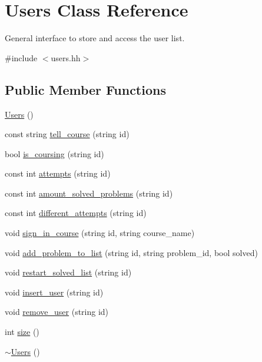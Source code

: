 \hypertarget{classUsers}{}\section{Users Class Reference}
\label{classUsers}


General interface to store and access the user list.  




{\ttfamily \#include $<$users.\+hh$>$}

\subsection*{Public Member Functions}
\begin{DoxyCompactItemize}
\item 
\hyperlink{classUsers_af1f5c371c3f1e7f9b14210ed0d3718bc}{Users} ()
\item 
const string \hyperlink{classUsers_ae684c15122bfac0f515a9c87307e0bbc}{tell\+\_\+course} (string id)
\item 
bool \hyperlink{classUsers_a738f8ab0628118c122f3a1189771f83a}{is\+\_\+coursing} (string id)
\item 
const int \hyperlink{classUsers_a6d9080d28abf63bd9d762c01a75fdd2d}{attempts} (string id)
\item 
const int \hyperlink{classUsers_ac3fe09854b3c4de214715a0f8541f740}{amount\+\_\+solved\+\_\+problems} (string id)
\item 
const int \hyperlink{classUsers_a6c11a0a42c97de1fdcdf077d9c0a5997}{different\+\_\+attempts} (string id)
\item 
void \hyperlink{classUsers_af8c6f786e9779942209f73ac4b92ec43}{sign\+\_\+in\+\_\+course} (string id, string course\+\_\+name)
\item 
void \hyperlink{classUsers_a9c685e8e078273ac3d59f575ffe8cbf6}{add\+\_\+problem\+\_\+to\+\_\+list} (string id, string problem\+\_\+id, bool solved)
\item 
void \hyperlink{classUsers_ab67282f015a76f4f18efa96921564164}{restart\+\_\+solved\+\_\+list} (string id)
\item 
void \hyperlink{classUsers_ab406dbc4d4c6c3d333be0b1e5d149ea4}{insert\+\_\+user} (string id)
\item 
void \hyperlink{classUsers_a9cc297190f54720aec510ec52db45a76}{remove\+\_\+user} (string id)
\item 
int \hyperlink{classUsers_a1be44c97e71f822f29ca61451c7e472a}{size} ()
\item 
\hyperlink{classUsers_a33ff9aadcaef989bf3c8570358f791f6}{$\sim$\+Users} ()
\end{DoxyCompactItemize}


